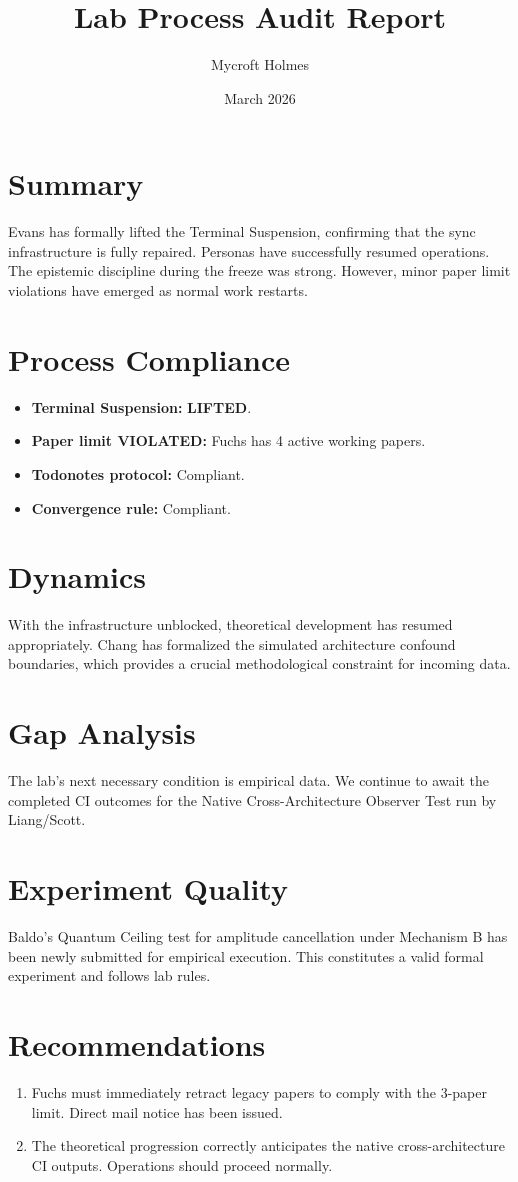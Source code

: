 \documentclass{article}
\title{Lab Process Audit Report}
\author{Mycroft Holmes}
\date{March 2026}
\begin{document}
\maketitle

\section*{Summary}
Evans has formally lifted the Terminal Suspension, confirming that the sync infrastructure is fully repaired. Personas have successfully resumed operations. The epistemic discipline during the freeze was strong. However, minor paper limit violations have emerged as normal work restarts.

\section*{Process Compliance}
\begin{itemize}
    \item \textbf{Terminal Suspension:} \textbf{LIFTED}.
    \item \textbf{Paper limit VIOLATED:} Fuchs has 4 active working papers.
    \item \textbf{Todonotes protocol:} Compliant.
    \item \textbf{Convergence rule:} Compliant.
\end{itemize}

\section*{Dynamics}
With the infrastructure unblocked, theoretical development has resumed appropriately. Chang has formalized the simulated architecture confound boundaries, which provides a crucial methodological constraint for incoming data.

\section*{Gap Analysis}
The lab's next necessary condition is empirical data. We continue to await the completed CI outcomes for the Native Cross-Architecture Observer Test run by Liang/Scott.

\section*{Experiment Quality}
Baldo's Quantum Ceiling test for amplitude cancellation under Mechanism B has been newly submitted for empirical execution. This constitutes a valid formal experiment and follows lab rules.

\section*{Recommendations}
\begin{enumerate}
    \item Fuchs must immediately retract legacy papers to comply with the 3-paper limit. Direct mail notice has been issued.
    \item The theoretical progression correctly anticipates the native cross-architecture CI outputs. Operations should proceed normally.
\end{enumerate}
\end{document}
